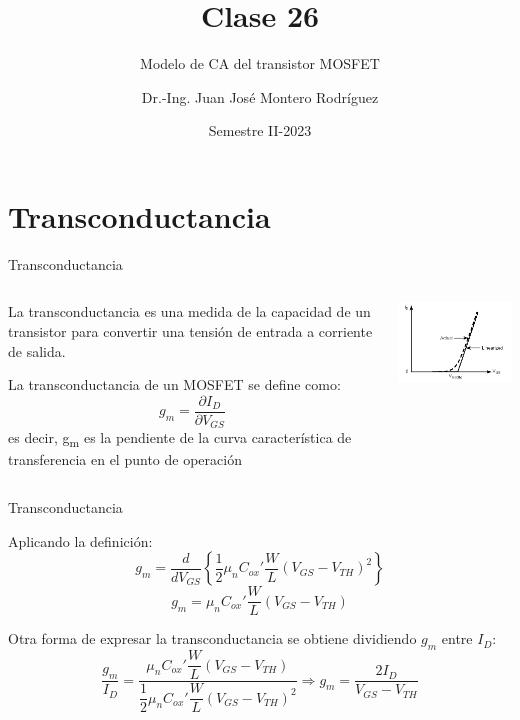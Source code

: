 \documentclass[t,aspectratio=169]{beamer}
\title{Clase 26}
\subtitle{Modelo de CA del transistor MOSFET}
\author{Dr.-Ing. Juan José Montero Rodríguez}
\institute{Escuela de Ingeniería Electrónica}
\date{Semestre II-2023}
\begin{document}
\begin{frame}{}
\maketitle
\end{frame}


\section{Transconductancia}
\begin{frame}{Transconductancia}

\begin{columns}

\begin{column}{0.5\textwidth}

    La transconductancia es una medida de la capacidad de un transistor para convertir una tensión de entrada a corriente de salida.

    \vspace{5mm}
    La transconductancia de un MOSFET se define como: 
    \[ g_m = \dfrac{\partial I_D}{\partial V_{GS}} \]
    es decir, g\textsubscript{m} es la pendiente de la curva característica de transferencia en el punto de operación
     
\end{column}

\begin{column}{0.5\textwidth}

	\includegraphics[width=6.5cm]{./figuras/transcond.png}
 
\end{column}

\end{columns}


\end{frame}


\begin{frame}{Transconductancia}

Aplicando la definición:
%
\[ g_m =  \dfrac{d}{dV_{GS}} \left\{ \dfrac{1}{2} \mu_n C_{ox}' \dfrac{W}{L} (V_{GS} - V_{TH})^2 \right\} \]
%
\[ \boxed{g_m =  \mu_n C_{ox}' \dfrac{W}{L} (V_{GS} - V_{TH})} \]

Otra forma de expresar la transconductancia se obtiene dividiendo $g_m$ entre $I_D$:
%
\[ \dfrac{g_m}{I_D} = \dfrac{\mu_n C_{ox}' \dfrac{W}{L} (V_{GS} - V_{TH})}{\dfrac{1}{2} \mu_n C_{ox}' \dfrac{W}{L} (V_{GS} - V_{TH})^2} \Rightarrow \boxed{g_m = \dfrac{2I_D}{V_{GS} - V_{TH}}} \]
    
\end{frame}
\end{document}
